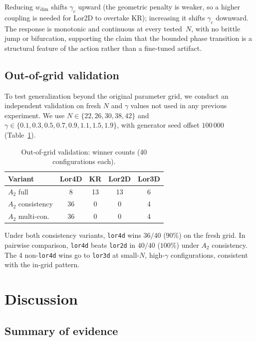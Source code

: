 \documentclass[12pt,a4paper]{article}
\begin{document}
Reducing $w_{\text{dim}}$ shifts $\gamma_c$ upward (the geometric penalty is
weaker, so a higher coupling is needed for Lor2D to overtake KR); increasing it
shifts $\gamma_c$ downward. The response is monotonic and continuous at every
tested~$N$, with no brittle jump or bifurcation, supporting the claim that the
bounded phase transition is a structural feature of the action rather than a
fine-tuned artifact.

\subsection{Out-of-grid validation}
\label{sec:oog}

To test generalization beyond the original parameter grid, we conduct an
independent validation on fresh $N$ and $\gamma$ values not used in any
previous experiment. We use $N \in \{22, 26, 30, 38, 42\}$ and
$\gamma \in \{0.1, 0.3, 0.5, 0.7, 0.9, 1.1, 1.5, 1.9\}$, with generator
seed offset $100\,000$ (Table~\ref{tab:oog}).

\begin{table}[h]
\centering
\caption{Out-of-grid validation: winner counts (40 configurations each).}
\label{tab:oog}
\begin{tabular}{lcccc}
\toprule
\textbf{Variant} & \textbf{Lor4D} & \textbf{KR} & \textbf{Lor2D} &
\textbf{Lor3D} \\
\midrule
$A_2$ full & 8 & 13 & 13 & 6 \\
$A_2$ consistency & 36 & 0 & 0 & 4 \\
$A_2$ multi-con. & 36 & 0 & 0 & 4 \\
\bottomrule
\end{tabular}
\end{table}

Under both consistency variants, \texttt{lor4d} wins $36/40$ ($90\%$) on the
fresh grid. In pairwise comparison, \texttt{lor4d} beats \texttt{lor2d} in
$40/40$ ($100\%$) under $A_2$ consistency. The 4 non-\texttt{lor4d} wins go to
\texttt{lor3d} at small-$N$, high-$\gamma$ configurations, consistent with the
in-grid pattern.

\section{Discussion}
\label{sec:discussion}

\subsection{Summary of evidence}
\end{document}
